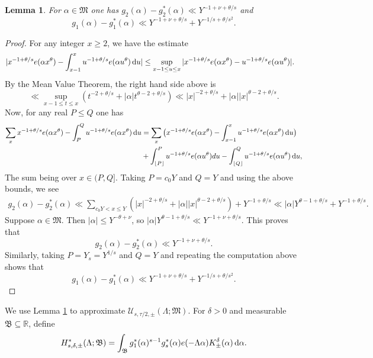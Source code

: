 \documentclass[11pt,reqno]{amsart}
\numberwithin{equation}{section}
\newtheorem{lemma}{Lemma}[section]
\renewcommand{\d}{\,{\rm d}}
\begin{document}
\begin{lemma} \label{lem:majapprox}
For $\alpha \in \mathfrak{M}$ one has $g_2(\alpha) -g^*_2(\alpha) \ll Y^{-1+\nu+\theta/s}$ and 
\[ g_1(\alpha) - g_1^*(\alpha) \ll Y^{-1+\nu+\theta/s}+ Y^{-1/s+\theta/s^2}. \] 
\end{lemma}

\begin{proof} For any integer $x \geq 2$, we have the estimate 
\begin{align*} |x^{-1+\theta/s}e(\alpha x^{\theta}) & -  \int_{x-1}^{x} u^{-1+\theta/s} e(\alpha u^{\theta})\d u| 
\leq \sup_{x-1 \leq u \leq x } |x^{-1+\theta/s}e(\alpha x^{\theta})-u^{-1+\theta/s}e(\alpha u^{\theta})|.  
\end{align*}
By the Mean Value Theorem, the right hand side above is 
\[ \ll \sup_{x-1 \leq t \leq x } (t^{-2+\theta/s}+|\alpha|t^{\theta-2+\theta/s} ) \ll |x|^{-2+\theta/s}+|\alpha||x|^{\theta-2+\theta/s}.  \]
Now, for any real $P \leq Q$ one has 
\begin{align*} \sum_{x} x^{-1+\theta/s}e(\alpha x^{\theta})-\int_P^Q u^{-1+\theta/s}e(\alpha x^{\theta})\d u & =  \sum_{x} \big (x^{-1+\theta/s}e(\alpha x^{\theta} )-\int_{x-1}^{x} u^{-1+\theta/s}e(\alpha x^{\theta} )\d u \big)
\\ & + \int_{\lfloor P \rfloor}^{P} u^{-1+\theta/s}e(\alpha u^{\theta}) du - \int_{\lfloor Q \rfloor}^{Q} u^{-1+\theta/s}e(\alpha u^{\theta}) \d u,
\end{align*}
The sum being over $x \in (P,Q]$. Taking $P = c_0Y$ and $Q = Y$ and using the above bounds, we see 
\begin{align*} g_2(\alpha)-g_2^*(\alpha) 
\ll \sum_{c_0Y < x \leq Y} (|x|^{-2+\theta/s}+|\alpha||x|^{\theta-2+\theta/s})+Y^{-1+\theta/s} \ll |\alpha|Y^{\theta-1+\theta/s}+Y^{-1+\theta/s}.
\end{align*}
Suppose $\alpha \in \mathfrak{M}$. Then $|\alpha| \leq Y^{-\theta+\nu}$, so $|\alpha|Y^{\theta-1+\theta/s} \ll Y^{-1+\nu+\theta/s}$. This proves that 
\[ g_2(\alpha)-g_2^*(\alpha) \ll Y^{-1+\nu+\theta/s}. \]
Similarly, taking $P = Y_s = Y^{1/s}$ and $Q = Y$ and repeating the computation above shows that 
\[ g_1(\alpha)-g_1^*(\alpha) \ll Y^{-1+\nu+\theta/s} + Y^{-1/s+\theta/s^2}. \]
\end{proof}

We use Lemma \ref{lem:majapprox} to approximate $\mathcal{U}_{s,\tau/2,\pm}(\Lambda;\mathfrak{M})$. 
For $\delta > 0$ and measurable $\mathfrak{B} \subseteq \mathbb{R}$, define 
\[ H^*_{s,\delta,\pm}(\Lambda;\mathfrak{B}) = \int_{\mathfrak{B}} g^*_1(\alpha)^{s-1}g^*_s(\alpha)e(-\Lambda\alpha)K^{\delta}_{\pm}(\alpha)\d\alpha. \]
\end{document}
